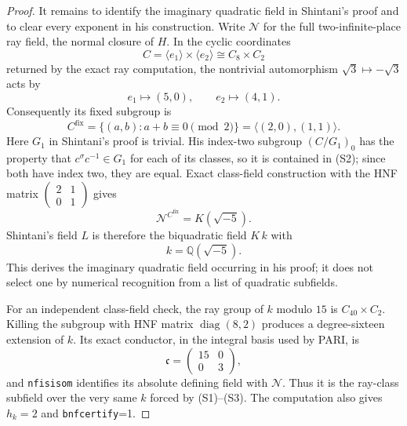 \documentclass[11pt]{article}
\newcommand{\Q}{\mathbb Q}
\begin{document}
\begin{proof}
It remains to identify the imaginary quadratic field in Shintani's
proof and to clear every exponent in his construction.  Write
$\mathcal N$ for the full two-infinite-place ray field, the normal
closure of $H$.  In the cyclic coordinates
\[
 C=\langle e_1\rangle\times\langle e_2\rangle
 \cong C_8\times C_2
\]
returned by the exact ray computation, the nontrivial automorphism
$\sqrt3\mapsto-\sqrt3$ acts by
\[
 e_1\longmapsto(5,0),\qquad e_2\longmapsto(4,1).
\tag{S1}
\]
Consequently its fixed subgroup is
\[
 C^{\mathrm{fix}}
 =\{(a,b):a+b\equiv0\pmod2\}
 =\langle(2,0),(1,1)\rangle.
\tag{S2}
\]
Here $G_1$ in Shintani's proof is trivial.  His index-two subgroup
$(C/G_1)_0$ has the property that $c^\sigma c^{-1}\in G_1$ for each
of its classes, so it is contained in (S2); since both have index two,
they are equal.  Exact class-field
construction with the HNF matrix
$\left(\begin{smallmatrix}2&1\\0&1\end{smallmatrix}\right)$ gives
\[
 \mathcal N^{C^{\mathrm{fix}}}
 =K(\sqrt{-5}).
\tag{S3}
\]
Shintani's field $L$ is therefore the biquadratic field
$K\,k$ with
\[
 k=\Q(\sqrt{-5}).
\]
This derives the imaginary quadratic field occurring in his proof;
it does not select one by numerical recognition from a list of
quadratic subfields.

For an independent class-field check, the ray group of $k$ modulo
$15$ is $C_{40}\times C_2$.  Killing the subgroup with HNF matrix
$\operatorname{diag}(8,2)$ produces a degree-sixteen extension of
$k$.  Its exact conductor, in the integral basis used by PARI, is
\[
 \mathfrak c=
 \begin{pmatrix}15&0\\0&3\end{pmatrix},
\tag{S4}
\]
and \texttt{nfisisom} identifies its absolute defining field with
$\mathcal N$.  Thus it is the ray-class subfield over the very same
$k$ forced by (S1)--(S3).  The computation also gives
$h_k=2$ and \texttt{bnfcertify}=1.


\end{proof}
\end{document}
